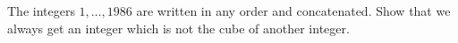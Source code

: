 The integers $1, \ldots, 1986$ are written in any order and concatenated. Show that we always get an integer which is not the cube of another integer.
